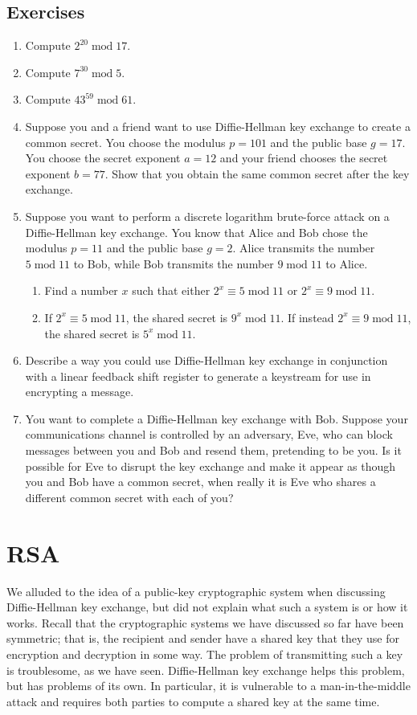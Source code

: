 \documentclass{book}
\theoremstyle{plain}
\theoremstyle{definition}
\newif\ifprintsolutions
\newcommand{\solution}[1]{\ifprintsolutions \begin{sloppypar}{\it #1}\end{sloppypar} \fi} %
\renewcommand{\mod}{\operatorname{mod}}
\renewcommand{\mod}{\operatorname{mod}}
\begin{document}
\section{Exercises}
\begin{enumerate}
\item Compute $2^{20} \mod 17$. \solution{$2^{20} \mod 17 = 16$}
\item Compute $7^{30} \mod 5$. \solution{$7^{30} \mod 5 = 4$}
\item Compute $43^{59} \mod 61$. \solution{$43^{59} \mod 61 = 44$}
\item Suppose you and a friend want to use Diffie-Hellman key exchange to create a common secret. You choose the modulus $p = 101$ and the public base $g = 17$. You choose the secret exponent $a = 12$ and your friend chooses the secret exponent $b = 77$. Show that you obtain the same common secret after the key exchange. \solution{You obtain the same secret $17^{12\times 77} \mod 101 \equiv 95 \mod 101$.}
\item Suppose you want to perform a discrete logarithm brute-force attack on a Diffie-Hellman key exchange. You know that Alice and Bob chose the modulus $p = 11$ and the public base $g = 2$. Alice transmits the number $5 \mod 11$ to Bob, while Bob transmits the number $9 \mod 11$ to Alice.
\begin{enumerate}
\item Find a number $x$ such that either $2^x \equiv 5 \mod 11$ or $2^x \equiv 9 \mod 11$.
\item If $2^x \equiv 5 \mod 11$, the shared secret is $9^x \mod 11$. If instead $2^x \equiv 9 \mod 11$, the shared secret is $5^x \mod 11$.
\end{enumerate}
\item Describe a way you could use Diffie-Hellman key exchange in conjunction with a linear feedback shift register to generate a keystream for use in encrypting a message.
\item You want to complete a Diffie-Hellman key exchange with Bob. Suppose your communications channel is controlled by an adversary, Eve, who can block messages between you and Bob and resend them, pretending to be you. Is it possible for Eve to disrupt the key exchange and make it appear as though you and Bob have a common secret, when really it is Eve who shares a different common secret with each of you?
\end{enumerate}

\chapter{RSA}
We alluded to the idea of a public-key cryptographic system when discussing Diffie-Hellman key exchange, but did not explain what such a system is or how it works. Recall that the cryptographic systems we have discussed so far have been symmetric; that is, the recipient and sender have a shared key that they use for encryption and decryption in some way. The problem of transmitting such a key is troublesome, as we have seen. Diffie-Hellman key exchange helps this problem, but has problems of its own. In particular, it is vulnerable to a man-in-the-middle attack and requires both parties to compute a shared key at the same time.
\end{document}

